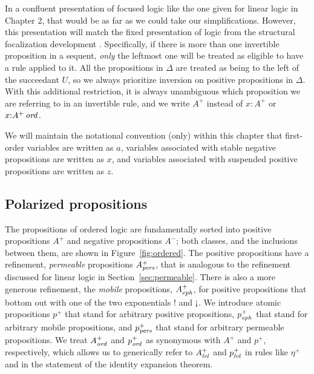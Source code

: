 In a confluent presentation of focused logic like the one given for
linear logic in Chapter 2, that would be as far as we could take our
simplifications. However, this presentation will match the fixed
presentation of logic from the structural focalization development
\cite{simmons11structural}. Specifically, if there is more than one
invertible proposition in a sequent, {\it only} the leftmost one will
be treated as eligible to have a rule applied to it. All the
propositions in $\Delta$ are treated as being to the left of the
succeedant $U$, so we always prioritize inversion on positive
propositions in $\Delta$. With this additional restriction, it is
always unambiguous which proposition we are referring to in an
invertible rule, and we write $A^+$ instead of $x{:}A^+$ or
$x{:}{A^+}\,{{\it ord}}$.

We will maintain the notational convention (only) within this chapter that
first-order variables are written as $a$, variables associated
with stable negative propositions are written as $x$, and variables
associated with suspended positive propositions are written as 
$z$.

\subsection{Polarized propositions}
\label{sec:ordpolarprop}

The propositions of ordered logic are fundamentally sorted into
positive propositions $A^+$ and negative propositions $A^-$; both
classes, and the inclusions between them, 
are shown in Figure~\ref{fig:ordered}. The
positive propositions have a refinement, {\it permeable} propositions
$A^+_{\it pers}$, that is analogous to the refinement discussed for linear
logic in Section~\ref{sec:permeable}. There is also a more generous
refinement, the {\it mobile} propositions, $A^+_{\it eph}$, for positive
propositions that bottom out with one of the two exponentials ${!}$ and
${\gnab}$. We introduce atomic propositions $p^+$ that stand for
arbitrary positive propositions, $p^+_{\it eph}$ that stand for arbitrary
mobile propositions, and $p^+_{\it pers}$ that stand for arbitrary
permeable propositions. We treat $A^+_{\it ord}$ and $p^+_{\it ord}$ as synonymous
with $A^+$ and $p^+$, respectively, which allows us to generically
refer to $A^+_{\it lvl}$ and $p^+_{\it lvl}$ in rules like $\eta^+$ and in the
statement of the identity expansion theorem.

